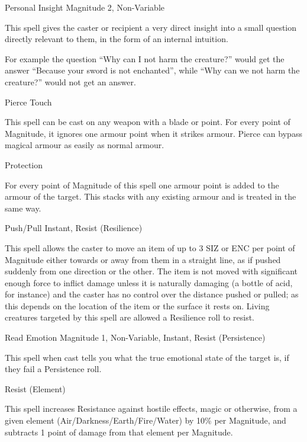 \begin{rpg-spell}
{Personal Insight}
{Magnitude 2, Non-Variable}

This spell gives the caster or recipient a very direct insight into a small question directly relevant to them, in the form of an internal intuition.

For example the question “Why can I not harm the creature?” would get the answer “Because your sword is not enchanted”, while “Why can we not harm the creature?” would not get an answer.
\end{rpg-spell}


\begin{rpg-spell}
{Pierce}
{Touch}

This spell can be cast on any weapon with a blade or point. For every point of Magnitude, it ignores one armour point when it strikes armour. Pierce can bypass magical armour as easily as normal armour. 
\end{rpg-spell}


\begin{rpg-spell}
{Protection}
{}

For every point of Magnitude of this spell one armour point is added to the armour of the target. This stacks with any existing armour and is treated in the same way. 
\end{rpg-spell}


\begin{rpg-spell}
{Push/Pull}
{Instant, Resist (Resilience)}

This spell allows the caster to move an item of up to 3 SIZ or ENC per point of Magnitude either towards or away from them in a straight line, as if pushed suddenly from one direction or the other. The item is not moved with significant enough force to inflict damage unless it is naturally damaging (a bottle of acid, for instance) and the caster has no control over the distance pushed or pulled; as this depends on the location of the item or the surface it rests on. Living creatures targeted by this spell are allowed a Resilience roll to resist.
\end{rpg-spell}


\begin{rpg-spell}
{Read Emotion}
{Magnitude 1, Non-Variable, Instant, Resist (Persistence)}

This spell when cast tells you what the true emotional state of the target is, if they fail a Persistence roll.
\end{rpg-spell}


\begin{rpg-spell}
{Resist (Element)}
{}

This spell increases Resistance against hostile effects, magic or otherwise, from a given element (Air/Darkness/Earth/Fire/Water) by 10\% per Magnitude, and subtracts 1 point of damage from that element per Magnitude.
\end{rpg-spell}


